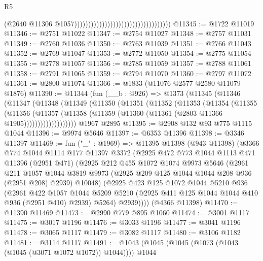\begin{lexlean}{R5}
\begin{coremodule}
                                                                        (@2640
                                                                          @11306
                                                                          @1057)))))))))))))))))))))))))))))))))))
@11345 := @1722 @11019
@11346 := @2751 @11022
@11347 := @2754 @11027
@11348 := @2757 @11031
@11349 := @2760 @11036
@11350 := @2763 @11039
@11351 := @2766 @11043
@11352 := @2769 @11047
@11353 := @2772 @11050
@11354 := @2775 @11054
@11355 := @2778 @11057
@11356 := @2785 @11059
@11357 := @2788 @11061
@11358 := @2791 @11065
@11359 := @2794 @11070
@11360 := @2797 @11072
@11361 := @2800 @11074
@11366 := @1833 (@11076 @2577 @2580 @11079 @1876)
@11390 := @11344
    (fun (__b : @926) =>
    @1373
      (@11345
        (@11346
          (@11347
            (@11348
              (@11349
                (@11350
                  (@11351
                    (@11352
                      (@11353
                        (@11354
                          (@11355
                            (@11356
                              (@11357
                                (@11358
                                  (@11359 (@11360 (@11361 (@2803 @11366 @1905)))))))))))))))))))
    @1967
    @2895
@11395 := @2908 @132 @93 @775 @1115 @1044
@11396 := @9974 @5646
@11397 := @6353 @11396
@11398 := @3346 @11397
@11469 := fun ("_" : @1969) =>
  @11395
    @11398
    (@943 @11398)
    (@3366
      @774
      @1044
      @1114
      @177
      @11397
      @3372
      (@2925
        @472
        @773
        @1044
        @1113
        @471
        @11396
        (@2951 @471)
        (@2925
          @212
          @455
          @1072
          @1074
          @9973
          @5646
          (@2961
            @211
            @1057
            @1044
            @3819
            @9973
            (@2925 @209 @125 @1044 @1044 @208 @936 (@2951 @208) @2939)
            @10048)
          (@2925
            @423
            @125
            @1072
            @1044
            @5210
            @936
            (@2961
              @422
              @1057
              @1044
              @5209
              @5210
              (@2925 @411 @125 @1044 @1044 @410 @936 (@2951 @410) @2939)
              @5264)
            @2939))))
    (@4366 @11398)
@11470 := @11390 @11469
@11473 := @2990 @779 @895 @1060
@11474 := @3001 @1117
@11475 := @3017 @1196
@11476 := @3033 @1196
@11477 := @3041 @1196
@11478 := @3065 @1117
@11479 := @3082 @1117
@11480 := @3106 @1182
@11481 := @3114 @1117
@11491 := @1043 (@1045 (@1045 (@1073 (@1043 (@1045 (@3071 @1072 @1072)) @1044)))) @1044

\end{coremodule}
\end{lexlean}

